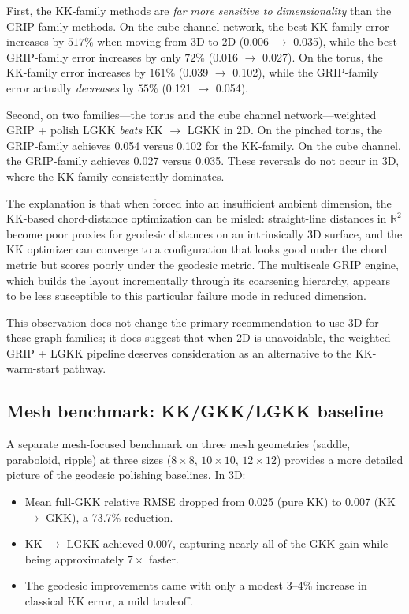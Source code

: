 \documentclass[11pt,twocolumn]{article}
\newcommand{\RR}{\mathbb{R}}
\begin{document}
First, the KK-family methods are \emph{far more sensitive to
dimensionality} than the GRIP-family methods.  On the cube channel
network, the best KK-family error increases by $517\%$ when moving from
3D to 2D (0.006 $\to$ 0.035), while the best GRIP-family error
increases by only $72\%$ (0.016 $\to$ 0.027).  On the torus, the
KK-family error increases by $161\%$ (0.039 $\to$ 0.102), while the
GRIP-family error actually \emph{decreases} by $55\%$
(0.121 $\to$ 0.054).

Second, on two families---the torus and the cube channel
network---weighted GRIP + polish LGKK \emph{beats} KK $\to$ LGKK in
2D.  On the pinched torus, the GRIP-family achieves 0.054 versus 0.102
for the KK-family.  On the cube channel, the GRIP-family achieves 0.027
versus 0.035.  These reversals do not occur in 3D, where the KK family
consistently dominates.

The explanation is that when forced into an insufficient ambient
dimension, the KK-based chord-distance optimization can be misled:
straight-line distances in $\RR^2$ become poor proxies for geodesic
distances on an intrinsically 3D surface, and the KK optimizer can
converge to a configuration that looks good under the chord metric but
scores poorly under the geodesic metric.  The multiscale GRIP engine,
which builds the layout incrementally through its coarsening hierarchy,
appears to be less susceptible to this particular failure mode in reduced
dimension.

This observation does not change the primary recommendation to use 3D
for these graph families; it does suggest that when 2D is unavoidable,
the weighted GRIP + LGKK pipeline deserves consideration as an
alternative to the KK-warm-start pathway.

\subsection{Mesh benchmark: KK/GKK/LGKK baseline}

A separate mesh-focused benchmark on three mesh geometries (saddle,
paraboloid, ripple) at three sizes ($8 \times 8$, $10 \times 10$,
$12 \times 12$) provides a more detailed picture of the geodesic
polishing baselines.  In 3D:

\begin{itemize}
\item Mean full-GKK relative RMSE dropped from 0.025 (pure KK) to 0.007
  (KK $\to$ GKK), a 73.7\% reduction.
\item KK $\to$ LGKK achieved 0.007, capturing nearly all of the GKK
  gain while being approximately $7\times$ faster.
\item The geodesic improvements came with only a modest 3--4\% increase
  in classical KK error, a mild tradeoff.
\end{itemize}
\end{document}
